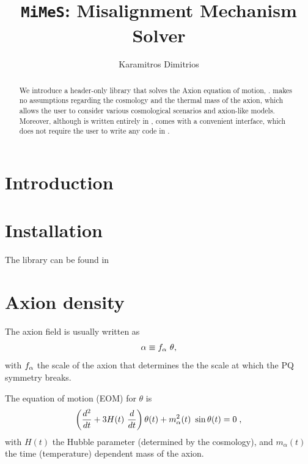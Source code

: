 \documentclass[11pt,a4paper]{article}
\author{Karamitros Dimitrios}
\title{{\tt MiMeS}: Misalignment Mechanism Solver}
\begin{document}
\maketitle

\begin{abstract}
	We introduce a \cpp header-only library that solves the Axion equation of motion, \mimes.  
	\mimes makes no assumptions regarding the cosmology and the thermal mass of the axion, which allows the user 
	to consider various cosmological scenarios and axion-like models.
	Moreover, although is written entirely in \cpp, \mimes comes with a convenient \py interface, which does not require the
	user to write any code in \cpp.
\end{abstract}


\section{Introduction}\label{sec:intro}
\setcounter{equation}{0}

\section{Installation}\label{sec:install}
\setcounter{equation}{0}

The library can be found in 








\section{Axion density}\label{sec:density}
\setcounter{equation}{0}
%
The axion field is usually written as 
%
\begin{equation}
	\alpha  \equiv f_{\alpha}{} \ \theta,
	\label{eq:fa_def}
\end{equation}
%
with $f_{\alpha}{}$ the scale of the axion that determines the the scale at which the PQ symmetry breaks. 

The equation of motion (EOM) for $\theta$ is 
%
\begin{equation}
	\lrb{\dfrac{d^2}{d t} + 3 H(t) \ \dfrac{d}{d t} } \theta(t) + m_{\alpha}^2(t) \ \sin \theta(t) = 0 \; ,
	\label{eq:eom}
\end{equation}
%
with $H(t)$ the Hubble parameter (determined by the cosmology), and $m_{\alpha}(t)$  the time (temperature) dependent mass of the axion. 
\end{document}

